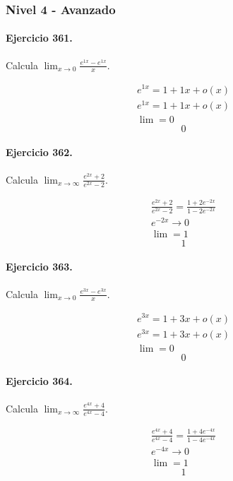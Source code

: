 \documentclass[11pt,a4paper]{article}
\begin{document}
\newpage

\subsubsection*{Nivel 4 - Avanzado}

\paragraph{Ejercicio 361.} Calcula $\displaystyle\lim_{x\to0}\frac{e^{1x}-e^{1x}}{x}$.

\[
\begin{aligned}
e^{1x}=1+1x+o(x)\\
e^{1x}=1+1x+o(x)\\
\lim=0
\end{aligned}
\]
\[\boxed{0}\]


\paragraph{Ejercicio 362.} Calcula $\displaystyle\lim_{x\to\infty}\frac{e^{2x}+2}{e^{2x}-2}$.

\[
\begin{aligned}
\frac{e^{2x}+2}{e^{2x}-2}=\frac{1+2e^{-2x}}{1-2e^{-2x}}\\
e^{-2x}\to0\\
\lim=1
\end{aligned}
\]
\[\boxed{1}\]


\paragraph{Ejercicio 363.} Calcula $\displaystyle\lim_{x\to0}\frac{e^{3x}-e^{3x}}{x}$.

\[
\begin{aligned}
e^{3x}=1+3x+o(x)\\
e^{3x}=1+3x+o(x)\\
\lim=0
\end{aligned}
\]
\[\boxed{0}\]


\paragraph{Ejercicio 364.} Calcula $\displaystyle\lim_{x\to\infty}\frac{e^{4x}+4}{e^{4x}-4}$.

\[
\begin{aligned}
\frac{e^{4x}+4}{e^{4x}-4}=\frac{1+4e^{-4x}}{1-4e^{-4x}}\\
e^{-4x}\to0\\
\lim=1
\end{aligned}
\]
\[\boxed{1}\]
\end{document}
